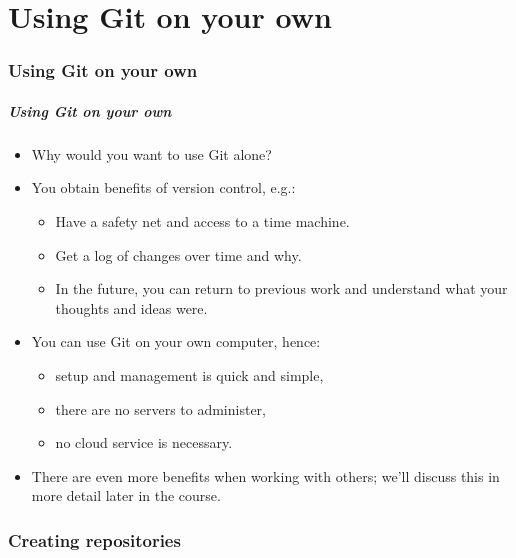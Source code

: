 \part{Using Git on your own}

\section{Using Git on your own}

\begin{frame}
\frametitle{Using Git on your own}
\begin{itemize}
    \item Why would you want to use Git alone?
    \item You obtain benefits of version control, e.g.:
        \begin{itemize}
            \item Have a safety net and access to a time machine.
            \item Get a log of changes over time and why.
            \item In the future, you can return to previous work and
                understand what your thoughts and ideas were.
        \end{itemize}
    \item You can use Git on your own computer, hence:
        \begin{itemize}
            \item setup and management is quick and simple,
            \item there are no servers to administer,
            \item no cloud service is necessary.
        \end{itemize}
    \item There are even more benefits when working with others; we'll
        discuss this in more detail later in the course.
\end{itemize}
\end{frame}

\section{Creating repositories}

